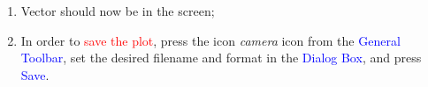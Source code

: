\documentclass[10pt,compress, unknownkeysallowed]{beamer}
\newcommand{\red}{\textcolor{red}}
\newcommand{\blue}{\textcolor{blue}}
\begin{document}
\begin{frame}
\begin{columns}
\begin{column}[l]{0.5\linewidth}
           \begin{enumerate}\scriptsize\setcounter{enumi}{4}
                \item<2-> Vector should now be in the screen;
                \item<2-> In order to \red{save the plot}, press the icon {\it camera} icon from the \blue{General Toolbar}, set the desired filename and format in the \blue{Dialog Box}, and press \blue{Save}.
           \end{enumerate}
        \end{column}
     \end{columns}
\end{frame}

\end{document}
